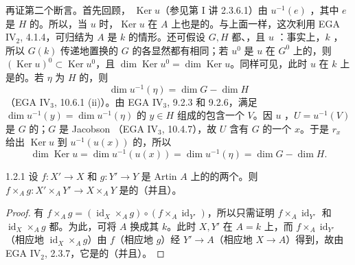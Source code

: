 再证第二个断言。首先回顾， $\operatorname{Ker}u$（参见第 I 讲 2.3.6.1）由 $u^{-1}(e)$ ，其中 $e$ 是 $H$ 的。所以，当 $u$ 时，$\operatorname{Ker}u$ 在 $A$ 上也是的。与上面一样，这次利用 EGA IV$_2$, 4.1.4，可归结为 $A$ 是 $k$ 的情形。还可假设 $G,H$ 都、，且 $u$ ：事实上，$k$ ，所以 $G(k)$ 传递地置换的 $G$ 的各显然都有相同；若 $u^0$ 是 $u$ 在 $G^0$ 上的，则 $(\operatorname{Ker}u)^0\subset\operatorname{Ker}u^0$，且 $\dim\operatorname{Ker}u^0=\dim\operatorname{Ker}u$。同样可见，此时 $u$ 在 $k$ 上是的。若 $\eta$ 为 $H$ 的，则
\[
\dim u^{-1}(\eta)=\dim G-\dim H
\]
（EGA IV$_3$, 10.6.1 (ii)）。由 EGA IV$_3$, 9.2.3 和 9.2.6，满足 $\dim u^{-1}(y)=\dim u^{-1}(\eta)$ 的 $y\in H$ 组成的包含一个 $V$。因 $u$ ，$U=u^{-1}(V)$ 是 $G$ 的；$G$ 是 Jacobson （EGA IV$_3$, 10.4.7），故 $U$ 含有 $G$ 的一个 $x$。于是 $r_x$ 给出 $\operatorname{Ker}u$ 到 $u^{-1}(u(x))$ 的，所以
\[
\dim\operatorname{Ker}u=\dim u^{-1}(u(x))=\dim u^{-1}(\eta)=\dim G-\dim H.
\]
\begin{SGAresult}{}{1.2.1}
设 $f:X'\to X$ 和 $g:Y'\to Y$ 是 Artin  $A$ 上的的两个。则 $f\times_Ag:X'\times_AY'\to X\times_AY$ 是的（并且）。
\end{SGAresult}
\begin{proof}
有 $f\times_Ag=(\operatorname{id}_X\times_Ag)\circ(f\times_A\operatorname{id}_{Y'})$，所以只需证明 $f\times_A\operatorname{id}_{Y'}$ 和 $\operatorname{id}_X\times_Ag$ 都。为此，可将 $A$ 换成其 $k$。此时 $X,Y'$ 在 $A=k$ 上，而 $f\times_A\operatorname{id}_{Y'}$（相应地 $\operatorname{id}_X\times_Ag$）由 $f$（相应地 $g$）经 $Y'\to A$（相应地 $X\to A$）得到，故由 EGA IV$_2$, 2.3.7，它是的（并且）。
\end{proof}

